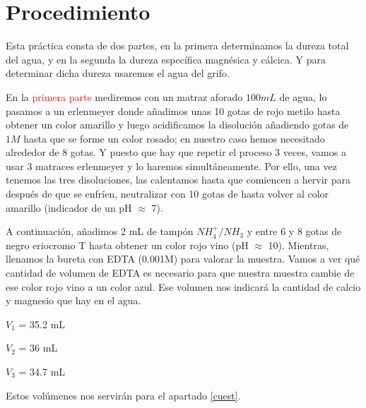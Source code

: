 \section{Procedimiento}
\noindent Esta práctica consta de dos partes, en la primera determinamos la dureza total del agua, y en la segunda la dureza específica magnésica y cálcica. Y para determinar dicha dureza usaremos el agua del grifo.

\vspace{0.2cm}

\noindent En la \textcolor{red}{primera parte} mediremos con un matraz aforado $100 mL$ de agua, lo pasamos a un erlenmeyer donde añadimos unas 10 gotas de rojo metilo hasta obtener un color amarillo y luego acidificamos la disolución añadiendo gotas de  $1M$ hasta que se forme un color rosado; en nuestro caso hemos necesitado alrededor de 8 gotas. Y puesto que hay que repetir el proceso 3 veces, vamos a usar 3 matraces erlenmeyer y lo haremos simultáneamente. Por ello, una vez tenemos las tres disoluciones, las calentamos hasta que comiencen a hervir para después de que se enfríen,  neutralizar con 10 gotas de  hasta volver al color amarillo (indicador de un pH $\approx$ 7).

\vspace{0.2cm}

\noindent A continuación, añadimos 2 mL de tampón $NH_4^+/NH_3$ y entre 6 y 8 gotas de negro eriocromo T hasta obtener un color rojo vino (pH $\approx$ 10). Mientras, llenamos la bureta con EDTA (0.001M) para valorar la muestra. Vamos a ver qué cantidad de volumen de EDTA es necesario para que nuestra muestra cambie de ese color rojo vino a un color azul. Ese volumen nos indicará la cantidad de calcio y magnesio que hay en el agua. 

\begin{multicols}{3}
\vspace{0.3cm}

$V_1$ = 35.2 mL

\vspace{0.1cm}

$V_2$ = 36 mL

\vspace{0.1cm}

$V_3$ = 34.7 mL

\vspace{0.3cm}
\end{multicols}

\noindent Estos volúmenes nos servirán para el apartado \ref{cuest}.

